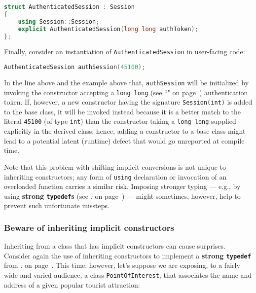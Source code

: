 \begin{lstlisting}[language=C++]
struct AuthenticatedSession : Session
{
    using Session::Session;
    explicit AuthenticatedSession(long long authToken);
};
\end{lstlisting}

\noindent Finally, consider an instantiation of \texttt{AuthenticatedSession} in
user-facing code:

\begin{lstlisting}[language=C++]
AuthenticatedSession authSession(45100);
\end{lstlisting}

\noindent In the line above and the example above that, \texttt{authSession} will be initialized by
invoking the constructor accepting a \texttt{long}~\texttt{long} (see ``" on page~\pageref{long-long}) authentication token. If, however, a new
constructor having the signature \texttt{Session(int)} is added to the
base class, it will be invoked instead because it is a better match to the
literal \texttt{45100} (of type \texttt{int}) than the constructor
taking a \texttt{long}~\texttt{long} supplied explicitly in the derived
class; hence, adding a constructor to a base class might lead to a
potential latent (runtime) defect that would go unreported at compile
time.

Note that this problem with shifting implicit conversions is not unique
to inheriting constructors; any form of \texttt{using} declaration or
invocation of an overloaded function carries a similar risk. Imposing
stronger typing --- e.g., by using \textbf{strong \texttt{typedef}s} (see \textit{: } on page~\pageref{implementing-a-strong-typedef}) --- might sometimes, however, help to prevent such
unfortunate missteps.

\subsubsection[Beware of inheriting implicit constructors]{Beware of inheriting implicit constructors}\label{beware-of-inheriting-implicit-constructors}

Inheriting from a class that has implicit constructors can cause
surprises. Consider again the use of inheriting constructors to
implement a \textbf{strong \texttt{typedef}} from \textit{: } on page~\pageref{implementing-a-strong-typedef}. This time, however, let's suppose we are
exposing, to a fairly wide and varied audience, a class
\texttt{PointOfInterest}, that associates the name and address of a
given popular tourist attraction:

